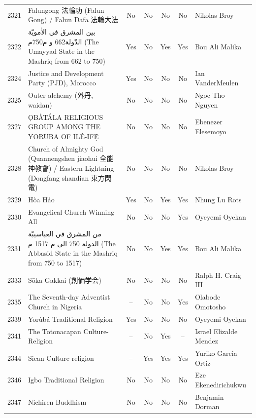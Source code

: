 {\begin{longtable}{rp{3.5cm}ccccp{3cm}}
2321 & {\raggedright Falungong 法輪功 (Falun Gong) / Falun Dafa 法輪大法} & No & No & No & No & {\raggedright Nikolas Broy} \\
2322 & {\raggedright {\arabicfont بين  المشرق في الأمويّة الدّولة}662 {\arabicfont و م}750{\arabicfont م} (The Umayyad State in the Mashriq from 662 to 750)} & Yes & No & Yes & Yes & {\raggedright Bou Ali Malika} \\
2324 & {\raggedright Justice and Development Party (PJD), Morocco} & Yes & No & No & No & {\raggedright Ian VanderMeulen} \\
2325 & {\raggedright Outer alchemy (外丹, waidan)} & No & No & No & No & {\raggedright Ngoc Tho Nguyen} \\
2327 & {\raggedright ỌBÀTÁLA RELIGIOUS GROUP AMONG THE YORUBA OF ILÉ-IFẸ̀} & No & No & No & No & {\raggedright Ebenezer Elesemoyo} \\
2328 & {\raggedright Church of Almighty God (Quannengshen jiaohui 全能神教會) / Eastern Lightning (Dongfang shandian 東方閃電)} & No & No & No & No & {\raggedright Nikolas Broy} \\
2329 & {\raggedright Hòa Hảo} & Yes & No & Yes & Yes & {\raggedright Nhung Lu Rots} \\
2330 & {\raggedright Evangelical Church Winning All} & No & No & No & Yes & {\raggedright Oyeyemi Oyekan} \\
2331 & {\raggedright {\arabicfont من  المشرق في العباسيبّة الدولة} 750 {\arabicfont الى م} 1517 {\arabicfont م} (The Abbasid State in the Mashriq from 750 to 1517)} & No & No & Yes & Yes & {\raggedright Bou Ali Malika} \\
2333 & {\raggedright Sōka Gakkai (創価学会)} & No & No & No & No & {\raggedright Ralph H. Craig III} \\
2335 & {\raggedright The Seventh-day Adventist Church in Nigeria} & -- & No & No & Yes & {\raggedright Olabode Omotosho} \\
2339 & {\raggedright Yorùbá Traditional Religion} & Yes & No & No & No & {\raggedright Oyeyemi Oyekan} \\
2341 & {\raggedright The Totonacapan Culture-Religion} & -- & No & Yes & -- & {\raggedright Israel Elizalde Mendez} \\
2344 & {\raggedright Sican Culture religion} & -- & Yes & Yes & Yes & {\raggedright Yuriko Garcia Ortiz} \\
2346 & {\raggedright Igbo Traditional Religion} & No & No & No & No & {\raggedright Eze Ekenedirichukwu} \\
2347 & {\raggedright Nichiren Buddhism} & No & No & No & No & {\raggedright Benjamin Dorman} \\

\end{longtable}}
